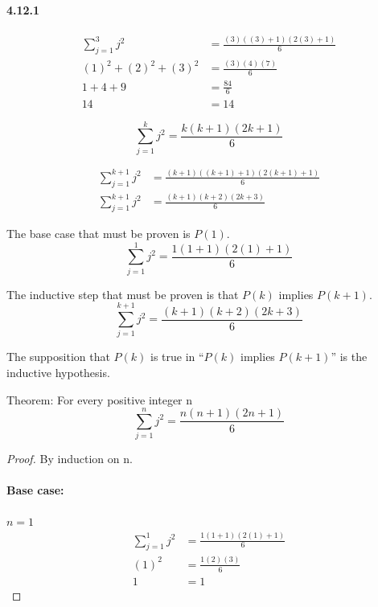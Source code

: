 \documentclass[11pt, letterpaper, twocolumn, fleqn]{article}
\begin{document}
    \paragraph{4.12.1}
        \begin{enumerate}
            \item 
                \begin{align*}
                 \sum_{j=1}^{3}j^2 &= \frac{(3)((3)+1)(2(3)+1)}{6} \\
                 (1)^2 + (2)^2 + (3)^2 &= \frac{(3)(4)(7)}{6} \\
                 1 + 4 + 9 &= \frac{84}{6} \\
                 14 &= 14
                \end{align*}
            \item $$\sum_{j=1}^{k} j^2 = \frac{k(k+1)(2k+1)}{6}$$
            \item 
                \begin{align*}
                 \sum_{j=1}^{k+1} j^2 &= \frac{(k+1)((k+1)+1)(2(k+1)+1)}{6}\\
                 \sum_{j=1}^{k+1} j^2 &= \frac{(k+1)(k+2)(2k+3)}{6}
                \end{align*}
            \item The base case that must be proven is $P(1)$.
                  $$\sum_{j=1}^{1} j^2 = \frac{1(1+1)(2(1)+1)}{6}$$
            \item The inductive step that must be proven is that $P(k)$ implies $P(k+1)$.
                  $$\sum_{j=1}^{k+1} j^2 = \frac{(k+1)(k+2)(2k+3)}{6}$$
            \item The supposition that $P(k)$ is true in ``$P(k)$ implies $P(k+1)$'' is the inductive hypothesis.
            \item Theorem: For every positive integer n 
             $$ \sum_{j=1}^{n} j^2 = \frac{n(n+1)(2n+1)}{6} $$
             \begin{proof} By induction on n.
              \item \paragraph{Base case:} $n=1$
              \begin{align*}
               \sum_{j=1}^{1} j^2 &= \frac{1(1+1)(2(1)+1)}{6} \\
               (1)^2              &= \frac{1(2)(3)}{6} \\
               1                  &= 1
              \end{align*}

\end{proof}
\end{enumerate}
\end{document}
